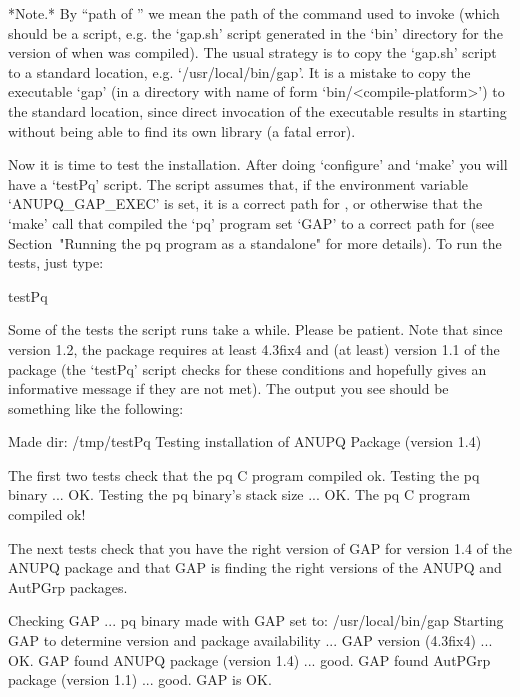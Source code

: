 *Note.* By ``path of {\GAP}'' we mean the path of  the  command  used  to
invoke {\GAP} (which  should  be  a  script,  e.g.  the  `gap.sh'  script
generated in the `bin' directory for the version of  {\GAP}  when  {\GAP}
was compiled). The usual strategy is to copy the  `gap.sh'  script  to  a
standard location, e.g. `/usr/local/bin/gap'. It is a mistake to copy the
{\GAP}  executable  `gap'   (in   a   directory   with   name   of   form
`bin/<compile-platform>')  to  the  standard   location,   since   direct
invocation of the executable results in  {\GAP}  starting  without  being
able to find its own library (a fatal error).


Now it is time to test the  installation.  After  doing  `configure'  and
`make' you will have a `testPq' script. The script assumes that,  if  the
environment variable `ANUPQ_GAP_EXEC' is set, it is a  correct  path  for
{\GAP}, or otherwise that the `make' call that compiled the  `pq' program
set `GAP' to a correct path  for  {\GAP}  (see  Section~"Running  the  pq
program as a standalone" for more details). To run the tests, just type:

\begintt
testPq
\endtt

Some of the tests the script runs take a while. Please be  patient.  Note
that since version 1.2, the {\ANUPQ} package  requires  at  least  {\GAP}
4.3fix4 and (at  least)  version  1.1  of  the  {\AutPGrp}  package  (the
`testPq' script checks  for  these  conditions  and  hopefully  gives  an
informative message if they are not met). The output you  see  should  be
something like the following:

\begintt
Made dir: /tmp/testPq
Testing installation of ANUPQ Package (version 1.4)

The first two tests check that the pq C program compiled ok.
Testing the pq binary ... OK.
Testing the pq binary's stack size ... OK.
The pq C program compiled ok!

The next tests check that you have the right version of GAP
for version 1.4 of the ANUPQ package and that GAP is finding
the right versions of the ANUPQ and AutPGrp packages.

Checking GAP ...
 pq binary made with GAP set to: /usr/local/bin/gap
 Starting GAP to determine version and package availability ...
  GAP version (4.3fix4) ... OK.
  GAP found ANUPQ package (version 1.4) ... good.
  GAP found AutPGrp package (version 1.1) ... good.
 GAP is OK.

